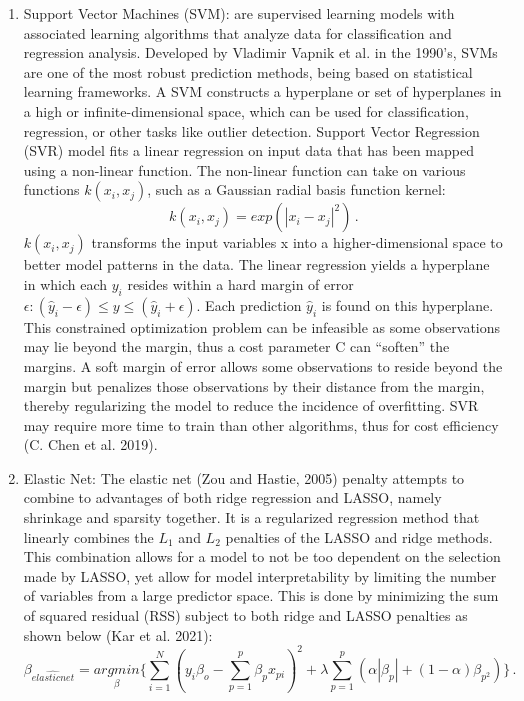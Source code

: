 \documentclass[12pt,italian, twoside]{report}
\begin{document}
\begin{enumerate}
\item 	Support Vector Machines (SVM): are supervised learning models with associated learning algorithms that analyze data for classification and regression analysis. Developed by Vladimir Vapnik et al. in the 1990’s, SVMs are one of the most robust prediction methods, being based on statistical learning frameworks. A SVM constructs a hyperplane or set of hyperplanes in a high or infinite-dimensional space, which can be used for classification, regression, or other tasks like outlier detection. Support Vector Regression (SVR) model fits a linear regression on input data that has been mapped using a non-linear function. The non-linear function can take on various functions \(k(x_i,x_j )\), such as a Gaussian radial basis function kernel: 
\begin{equation}
	k(x_i,x_j )=exp(|x_i- x_j |^2)  \, .
	\label{eq:SVM}
\end{equation}
\(k(x_i,x_j )\)  transforms the input variables x into a higher-dimensional space to better model patterns in the data. The linear regression yields a hyperplane in which each \(y_i\) resides within a hard margin of error \(\epsilon: (\hat{y}_i -\epsilon) \leq y \leq (\hat{y}_i +\epsilon)\). Each prediction \(\hat{y}_i\) is found on this hyperplane. This constrained optimization problem can be infeasible as some observations may lie beyond the margin, thus a cost parameter C can “soften” the margins. A soft margin of error allows some observations to reside beyond the margin but penalizes those observations by their distance from the margin, thereby regularizing the model to reduce the incidence of overfitting. SVR may require more time to train than other algorithms, thus for cost efficiency (C. Chen et al. 2019).
\item 	Elastic Net: The elastic net (Zou and Hastie, 2005) penalty attempts to combine to advantages of both ridge regression and LASSO, namely shrinkage and sparsity together. It is a regularized regression method that linearly combines the \(L_1\) and \(L_2\) penalties of the LASSO and ridge methods. This combination allows for a model to not be too dependent on the selection made by LASSO, yet allow for model interpretability by limiting the number of variables from a large predictor space. This is done by minimizing the sum of squared residual (RSS) subject to both ridge and LASSO penalties as shown below (Kar et al. 2021):
\begin{equation}
   \beta_{\hat{elastic net}} = \underset{\beta}{argmin} \Bigg\{ \sum^N_{i=1} (y_i \beta_o - \sum^p_{p=1} \beta_p x_{pi})^2 + \lambda \sum^p_{p=1} (\alpha |\beta_p| + (1- \alpha) \beta_{p^2})\Bigg\}   \, .

\end{equation}
\end{enumerate}
\end{document}
